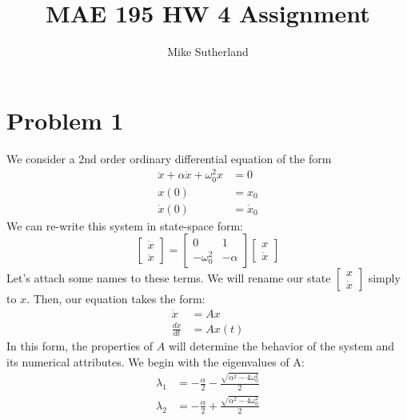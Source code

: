 \documentclass[10pt,letterpaper,notitlepage]{article}
\author{Mike Sutherland}
\title{MAE 195 HW 4 Assignment}
\begin{document}
	\maketitle
	\section{Problem 1}
	We consider a 2nd order ordinary differential equation of the form
	\begin{equation}
		\begin{aligned}
			\ddot{x} + \alpha \dot{x} + \omega_0^2 x &= 0 \\
			x(0) &= x_0 \\
			\dot{x}(0) &= \dot{x}_0
		\end{aligned}
		\label{eq:problem1}
	\end{equation}
	We can re-write this system in state-space form:
	\begin{equation}
		\begin{bmatrix}
			\dot{x} \\
			\ddot{x}
		\end{bmatrix}
		=
		\begin{bmatrix}
			0 & 1 \\
			-\omega_0^2 & -\alpha
		\end{bmatrix}
		\begin{bmatrix}
			x \\
			\dot{x}
		\end{bmatrix}
	\end{equation}
	Let's attach some names to these terms. We will rename our state $\begin{bmatrix}
		x \\
		\dot{x}
	\end{bmatrix}$ simply to $x$. Then, our equation takes the form:
	\begin{equation}
		\begin{aligned}
			\dot{x} &= A x \\
			\frac{dx}{dt} &= A x(t)
		\end{aligned}
	\end{equation}
	In this form, the properties of $A$ will determine the behavior of the system and its numerical attributes. We begin with the eigenvalues of A:
	\begin{equation}
		\begin{aligned}
			\lambda_1 &= -\frac{\alpha}{2} - \frac{\sqrt{\alpha^2 - 4 \omega_0^2}}{2} \\
			\lambda_2 &= -\frac{\alpha}{2} + \frac{\sqrt{\alpha^2 - 4 \omega_0^2}}{2}
		\end{aligned}
	\end{equation}
\end{document}
